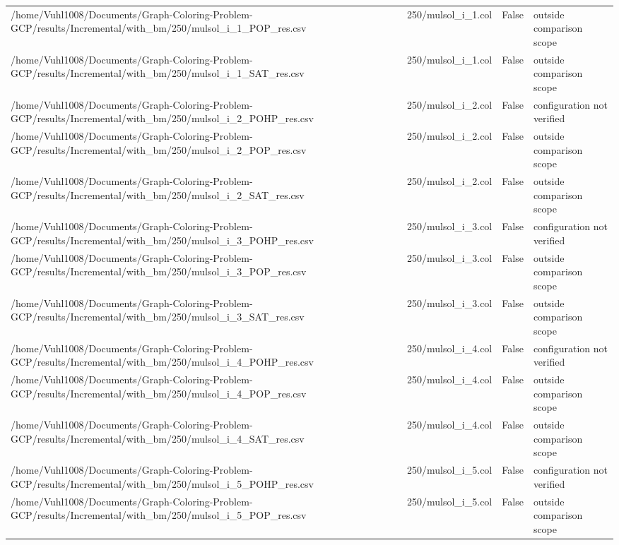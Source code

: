 \begin{table}[htbp]
\begin{tabular}{llll}
/home/Vuhl1008/Documents/Graph-Coloring-Problem-GCP/results/Incremental/with\_bm/250/mulsol\_i\_1\_POP\_res.csv & 250/mulsol\_i\_1.col & False & outside comparison scope \\
/home/Vuhl1008/Documents/Graph-Coloring-Problem-GCP/results/Incremental/with\_bm/250/mulsol\_i\_1\_SAT\_res.csv & 250/mulsol\_i\_1.col & False & outside comparison scope \\
/home/Vuhl1008/Documents/Graph-Coloring-Problem-GCP/results/Incremental/with\_bm/250/mulsol\_i\_2\_POHP\_res.csv & 250/mulsol\_i\_2.col & False & configuration not verified \\
/home/Vuhl1008/Documents/Graph-Coloring-Problem-GCP/results/Incremental/with\_bm/250/mulsol\_i\_2\_POP\_res.csv & 250/mulsol\_i\_2.col & False & outside comparison scope \\
/home/Vuhl1008/Documents/Graph-Coloring-Problem-GCP/results/Incremental/with\_bm/250/mulsol\_i\_2\_SAT\_res.csv & 250/mulsol\_i\_2.col & False & outside comparison scope \\
/home/Vuhl1008/Documents/Graph-Coloring-Problem-GCP/results/Incremental/with\_bm/250/mulsol\_i\_3\_POHP\_res.csv & 250/mulsol\_i\_3.col & False & configuration not verified \\
/home/Vuhl1008/Documents/Graph-Coloring-Problem-GCP/results/Incremental/with\_bm/250/mulsol\_i\_3\_POP\_res.csv & 250/mulsol\_i\_3.col & False & outside comparison scope \\
/home/Vuhl1008/Documents/Graph-Coloring-Problem-GCP/results/Incremental/with\_bm/250/mulsol\_i\_3\_SAT\_res.csv & 250/mulsol\_i\_3.col & False & outside comparison scope \\
/home/Vuhl1008/Documents/Graph-Coloring-Problem-GCP/results/Incremental/with\_bm/250/mulsol\_i\_4\_POHP\_res.csv & 250/mulsol\_i\_4.col & False & configuration not verified \\
/home/Vuhl1008/Documents/Graph-Coloring-Problem-GCP/results/Incremental/with\_bm/250/mulsol\_i\_4\_POP\_res.csv & 250/mulsol\_i\_4.col & False & outside comparison scope \\
/home/Vuhl1008/Documents/Graph-Coloring-Problem-GCP/results/Incremental/with\_bm/250/mulsol\_i\_4\_SAT\_res.csv & 250/mulsol\_i\_4.col & False & outside comparison scope \\
/home/Vuhl1008/Documents/Graph-Coloring-Problem-GCP/results/Incremental/with\_bm/250/mulsol\_i\_5\_POHP\_res.csv & 250/mulsol\_i\_5.col & False & configuration not verified \\
/home/Vuhl1008/Documents/Graph-Coloring-Problem-GCP/results/Incremental/with\_bm/250/mulsol\_i\_5\_POP\_res.csv & 250/mulsol\_i\_5.col & False & outside comparison scope \\

\end{tabular}
\end{table}
